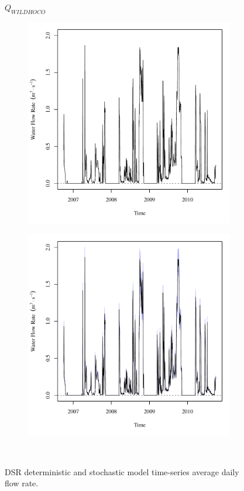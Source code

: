 \subfiguremid
\begin{landscape}
	\begin{figure}
		\centering
		$ Q_{WILDHOCO} $
		\begin{subfigure}{0.7\textwidth}
			\centering
			\includegraphics[width=\tableCustomSize]{"Figures/Results_DSR/Deterministic/Q WIL"}
		\end{subfigure}%
		\begin{subfigure}{0.7\textwidth}
			\centering
			\includegraphics[width=\tableCustomSize]{"Figures/Results_DSR/Stochastic/Q WIL"}
		\end{subfigure}\\
		\caption{DSR deterministic and stochastic model time-series average daily flow rate.}
	\end{figure}
\end{landscape}

